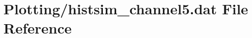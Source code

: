 \hypertarget{Plotting_2histsim__channel5_8dat}{}\section{Plotting/histsim\+\_\+channel5.dat File Reference}
\label{Plotting_2histsim__channel5_8dat}
